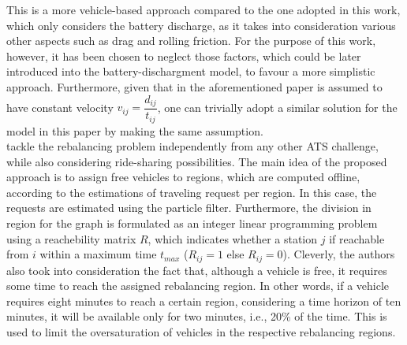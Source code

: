 This is a more vehicle-based approach compared to the one adopted in this work, which only considers the battery discharge, as it takes into consideration various other aspects such as drag and rolling friction. For the purpose of this work, however, it has been chosen to neglect those factors, which could be later introduced into the battery-dischargment model, to favour a more simplistic approach. Furthermore, given that in the aforementioned paper is assumed to have constant velocity $v_{ij} = \dfrac{d_{ij}}{t_{ij}}$, one can trivially adopt a similar solution for the model in this paper by making the same assumption. \\
 tackle the rebalancing problem independently from any other ATS challenge, while also considering ride-sharing possibilities. The main idea of the proposed approach is to assign free vehicles to regions, which are computed offline, according to the estimations of traveling request per region. In this case, the requests are estimated using the particle filter. Furthermore, the division in region for the graph is formulated as an integer linear programming problem using a reachebility matrix $R$, which indicates whether a station $j$ if reachable from $i$ within a maximum time $t_{max}$ ($R_{ij} = 1$ else $R_{ij} = 0$). Cleverly, the authors also took into consideration the fact that, although a vehicle is free, it requires some time to reach the assigned rebalancing region. In other words, if a vehicle requires eight minutes to reach a certain region, considering a time horizon of ten minutes, it will be available only for two minutes, i.e., 20\% of the time. This is used to limit the oversaturation of vehicles in the respective rebalancing regions. 

